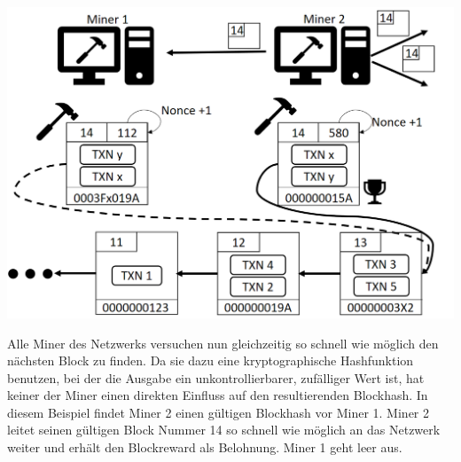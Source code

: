 \vspace{1cm}
\begin{minipage}{0.55\textwidth}
\includegraphics[width=\textwidth]{Figures/konzept_btc/konzept9}
\centering
\decoRule
{}
\label{fig:konzept9}
\end{minipage}
\begin{minipage}{0.45\textwidth}
Alle Miner des Netzwerks versuchen nun gleichzeitig so schnell wie möglich den nächsten Block zu finden. Da sie dazu eine kryptographische Hashfunktion benutzen, bei der die Ausgabe ein unkontrollierbarer, zufälliger Wert ist, hat keiner der Miner einen direkten Einfluss auf den resultierenden Blockhash. In diesem Beispiel findet Miner 2 einen gültigen Blockhash vor Miner 1. Miner 2 leitet seinen gültigen Block Nummer 14 so schnell wie möglich an das Netzwerk weiter und erhält den Blockreward als Belohnung. Miner 1 geht leer aus.
\end{minipage}


